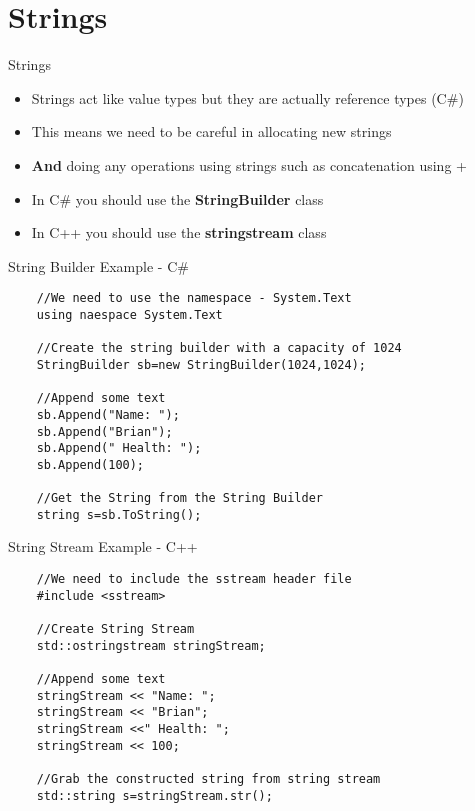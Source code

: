 \part{Strings}
\frame{\partpage}

\begin{frame}{Strings}
	\begin{itemize}
		\item Strings act like value types but they are actually reference types (C\#)
		\item This means we need to be careful in allocating new strings
		\item \textbf{And} doing any operations using strings such as concatenation using +
		\item In C\# you should use the \textbf{StringBuilder} class 
		\item In C++ you should use the \textbf{stringstream} class
	\end{itemize}
\end{frame}

\begin{frame}[fragile]{String Builder Example - C\#}
	\begin{lstlisting}
	//We need to use the namespace - System.Text
	using naespace System.Text
	
	//Create the string builder with a capacity of 1024
	StringBuilder sb=new StringBuilder(1024,1024);
	
	//Append some text
	sb.Append("Name: ");
	sb.Append("Brian");
	sb.Append(" Health: ");
	sb.Append(100);
	
	//Get the String from the String Builder
	string s=sb.ToString();
	\end{lstlisting}
\end{frame}

\begin{frame}[fragile]{String Stream Example - C++}
	\begin{lstlisting}
	//We need to include the sstream header file
	#include <sstream>
	
	//Create String Stream
	std::ostringstream stringStream;
	
	//Append some text
	stringStream << "Name: ";
	stringStream << "Brian";
	stringStream <<" Health: ";
	stringStream << 100;
	
	//Grab the constructed string from string stream
	std::string s=stringStream.str();
	
	\end{lstlisting}
\end{frame}
